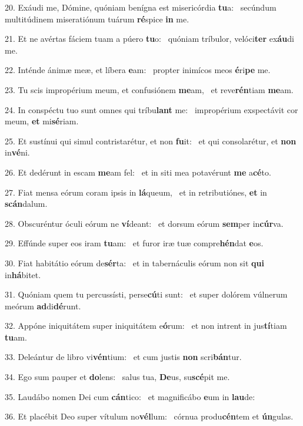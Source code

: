 20. Exáudi me, Dómine, quóniam benígna est misericórdia \textbf{tu}a: \ast\  secúndum multitúdinem miseratiónum tuárum \textbf{ré}spice \textbf{in} me.\

21. Et ne avértas fáciem tuam a púero \textbf{tu}o: \ast\  quóniam tríbulor, velóci\textbf{ter} ex\textbf{áu}di me.\

22. Inténde ánimæ meæ, et líbera \textbf{e}am: \ast\  propter inimícos meos \textbf{é}ri\textbf{pe} me.\

23. Tu scis impropérium meum, et confusiónem \textbf{me}am, \ast\  et reve\textbf{rén}tiam \textbf{me}am.\

24. In conspéctu tuo sunt omnes qui tríbu\textbf{lant} me: \ast\  impropérium exspectávit cor meum, \textbf{et} mi\textbf{sé}riam.\

25. Et sustínui qui simul contristarétur, et non \textbf{fu}it: \ast\  et qui consolarétur, et \textbf{non} in\textbf{vé}ni.\

26. Et dedérunt in escam \textbf{me}am fel: \ast\  et in siti mea potavérunt \textbf{me} a\textbf{cé}to.\

27. Fiat mensa eórum coram ipsis in \textbf{lá}queum, \ast\  et in retributiónes, \textbf{et} in \textbf{scán}dalum.\

28. Obscuréntur óculi eórum ne \textbf{ví}deant: \ast\  et dorsum eórum \textbf{sem}per in\textbf{cúr}va.\

29. Effúnde super eos iram \textbf{tu}am: \ast\  et furor iræ tuæ compre\textbf{hén}dat \textbf{e}os.\

30. Fiat habitátio eórum de\textbf{sér}ta: \ast\  et in tabernáculis eórum non sit \textbf{qui} in\textbf{há}bitet.\

31. Quóniam quem tu percussísti, perse\textbf{cú}ti sunt: \ast\  et super dolórem vúlnerum meórum \textbf{ad}di\textbf{dé}runt.\

32. Appóne iniquitátem super iniquitátem e\textbf{ó}rum: \ast\  et non intrent in jus\textbf{tí}tiam \textbf{tu}am.\

33. Deleántur de libro vi\textbf{vén}tium: \ast\  et cum justis \textbf{non} scri\textbf{bán}tur.\

34. Ego sum pauper et \textbf{do}lens: \ast\  salus tua, \textbf{De}us, su\textbf{scé}pit me.\

35. Laudábo nomen Dei cum \textbf{cán}tico: \ast\  et magnificábo \textbf{e}um in \textbf{lau}de:\

36. Et placébit Deo super vítulum no\textbf{vél}lum: \ast\  córnua produ\textbf{cén}tem et \textbf{ún}gulas.\

